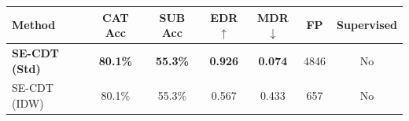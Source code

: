 \begin{tabular}{|l|c|c|c|c|c|c|}
\hline
\textbf{Method} & \textbf{CAT Acc} & \textbf{SUB Acc} & \textbf{EDR$\uparrow$} & \textbf{MDR$\downarrow$} & \textbf{FP} & \textbf{Supervised} \\
\hline
\textbf{SE-CDT (Std)} & \textbf{80.1\%} & \textbf{55.3\%} & \textbf{0.926} & \textbf{0.074} & 4846 & No \\
SE-CDT (IDW) & 80.1\% & 55.3\% & 0.567 & 0.433 & 657 & No \\
\hline
\end{tabular}